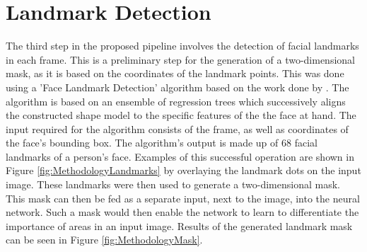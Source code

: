 \section{Landmark Detection}
The third step in the proposed pipeline involves the detection of facial landmarks in each frame. This is a preliminary step for the generation of a two-dimensional mask, as it is based on the coordinates of the landmark points.
\newline\newline
This was done using a 'Face Landmark Detection' algorithm based on the work done by \citet{Kazemi:2014:ShapePredictor}. The algorithm is based on an ensemble of regression trees which successively aligns the constructed shape model to the specific features of the the face at hand.
\newline\newline
The input required for the algorithm consists of the frame, as well as coordinates of the face's bounding box. The algorithm's output is made up of 68 facial landmarks of a person's face. Examples of this successful operation are shown in Figure \ref{fig:MethodologyLandmarks} by overlaying the landmark dots on the input image.
\newline\newline
These landmarks were then used to generate a two-dimensional mask. This mask can then be fed as a separate input, next to the image, into the neural network. Such a mask would then enable the network to learn to differentiate the importance of areas in an input image. Results of the generated landmark mask can be seen in Figure \ref{fig:MethodologyMask}.

